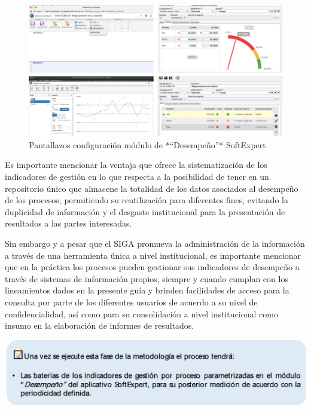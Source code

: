 \documentclass[
]{book}
\begin{document}
\begin{figure}

{\centering \includegraphics[width=1\linewidth]{Imagenes/figura_18} 

}

\caption{Pantallazos configuración módulo de *“Desempeño”* SoftExpert}\label{fig:unnamed-chunk-16}
\end{figure}

Es importante mencionar la ventaja que ofrece la sistematización de los indicadores de gestión en lo que respecta a la posibilidad de tener en un repositorio único que almacene la totalidad de los datos asociados al desempeño de los procesos, permitiendo su reutilización para diferentes fines, evitando la duplicidad de información y el desgaste institucional para la presentación de resultados a las partes interesadas.

Sin embargo y a pesar que el SIGA promueva la administración de la información a través de una herramienta única a nivel institucional, es importante mencionar que en la práctica los procesos pueden gestionar sus indicadores de desempeño a través de sistemas de información propios, siempre y cuando cumplan con los lineamientos dados en la presente guía y brinden facilidades de acceso para la consulta por parte de los diferentes usuarios de acuerdo a su nivel de confidencialidad, así como para su consolidación a nivel institucional como insumo en la elaboración de informes de resultados.

\begin{center}\includegraphics[width=0.8\linewidth]{Imagenes/texto_6} \end{center}
\end{document}
